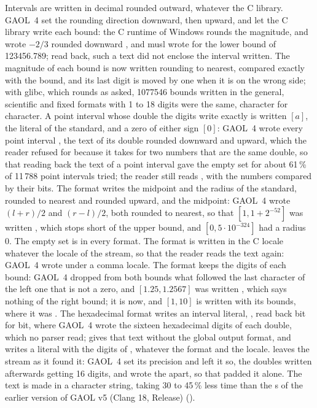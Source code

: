 \documentclass[12pt,a4paper,twoside,openright]{book}
\begin{document}
\medskip
Intervals are written in decimal rounded outward, whatever the C
library.\newinvfive{} GAOL~4 set the rounding direction downward, then
upward, and let the C library write each bound: the C runtime of Windows
rounds the magnitude, and wrote $-2/3$ rounded downward , and
musl wrote  for the lower bound of 123456.789; read back,
such a text did not enclose the interval written. The magnitude of each
bound is now written rounding to nearest, compared exactly with the bound,
and its last digit is moved by one when it is on the wrong side; with glibc,
which rounds as asked, 1077546 bounds written in the general, scientific and
fixed formats with 1 to 18 digits were the same, character for character. A
point interval whose double the digits write exactly is written $[a]$, the
literal of the standard, and a zero of either sign $[0]$: GAOL~4 wrote every
point interval , the text of its double rounded downward and
upward, which the reader refused for  because it takes
 for two numbers that are the same double, so that reading back
the text of a point interval gave the empty set for about 61\,\% of 11\,788
point intervals tried; the reader still reads , with the numbers
compared by their bits. The format  writes the midpoint and
the radius of the standard,  rounded to nearest and
 rounded upward, and  the midpoint: GAOL~4 wrote
$(l + r)/2$ and $(r - l)/2$, both rounded to nearest, so that $[1, 1 +
2^{-52}]$ was written , which stops short
of the upper bound, and $[0, 5 \cdot 10^{-324}]$ had a radius 0. The empty
set is \code{[empty]} in every format. The format  is
written in the C locale whatever the locale of the stream, so that the reader
reads the text again: GAOL~4 wrote \code{[0,25, 0,5]} under a comma locale.
The format  keeps the digits of each bound: GAOL~4 dropped
from both bounds what followed the last character of the left one that is
not a zero, and $[1.25, 1.2567]$ was written , which says
nothing of the right bound; it is  now, and $[1, 10]$
is written with its bounds, where it was . The hexadecimal
format writes an interval literal, \code{[0x1.999999999999ap-4, ...]}, read
back bit for bit, where GAOL~4 wrote the sixteen hexadecimal digits of each
double, which no parser read;  gives that text
without the global output format, and 
writes a literal with the digits of , whatever
the format and the locale.  leaves the stream as it found
it: GAOL~4 set its precision and left it so, the doubles written afterwards
getting 16 digits, and wrote the \code{[} apart, so that
 padded it alone. The text is made in a character string,
taking 30 to 45\,\% less time than the s of the earlier
version of GAOL v5 (Clang 18, Release) ().
\end{document}
